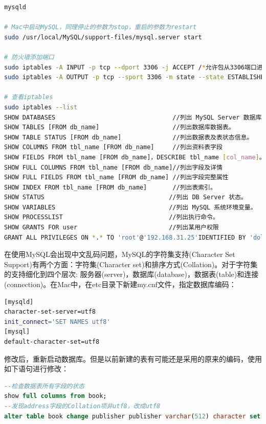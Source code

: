 \documentclass[12pt]{book}
\numberwithin{dummy}{section}
\theoremstyle{ocrenumbox}
\theoremstyle{blacknumex}
\theoremstyle{blacknumbox}
\theoremstyle{ocrenum}
\begin{document}
\begin{lstlisting}[language=Bash]
mysqld

# Mac中启动MySQL，同理停止的参数为stop，重启的参数为restart
sudo /usr/local/MySQL/support-files/mysql.server start

# 防火墙添加端口
sudo iptables -A INPUT -p tcp --dport 3306 -j ACCEPT /*允许包从3306端口进入*/
sudo iptables -A OUTPUT -p tcp --sport 3306 -m state --state ESTABLISHED -j ACCEPT /*允许从3306端口进入的包返回*/

# 查看iptables
sudo iptables --list
SHOW DATABASES                                //列出 MySQL Server 数据库。
SHOW TABLES [FROM db_name]                    //列出数据库数据表。
SHOW TABLE STATUS [FROM db_name]              //列出数据表及表状态信息。
SHOW COLUMNS FROM tbl_name [FROM db_name]     //列出资料表字段
SHOW FIELDS FROM tbl_name [FROM db_name]，DESCRIBE tbl_name [col_name]。
SHOW FULL COLUMNS FROM tbl_name [FROM db_name]//列出字段及详情
SHOW FULL FIELDS FROM tbl_name [FROM db_name] //列出字段完整属性
SHOW INDEX FROM tbl_name [FROM db_name]       //列出表索引。
SHOW STATUS                                  //列出 DB Server 状态。
SHOW VARIABLES                               //列出 MySQL 系统环境变量。
SHOW PROCESSLIST                             //列出执行命令。
SHOW GRANTS FOR user                         //列出某用户权限
GRANT ALL PRIVILEGES ON *.* TO 'root'@'192.168.31.25'IDENTIFIED BY 'dolphin' WITH GRANT OPTION;
\end{lstlisting}

在使用MySQL会出现中文乱码问题，MySQL的字符集支持(Character Set Support)有两个方面：字符集(Character set)和排序方式(Collation)。对于字符集的支持细化到四个层次: 服务器(server)，数据库(database)，数据表(table)和连接(connection)。在Mac中，在etc目录下新建my.cnf文件，指定数据库编码：

\begin{lstlisting}[language=Bash]
[mysqld]
character-set-server=utf8
init_connect='SET NAMES utf8'
[mysql]
default-character-set=utf8
\end{lstlisting}

修改后，重新启动数据库。但是以前新建的表有可能还是采用的原来的编码，使用如下语句进行修改：

\begin{lstlisting}[language=SQL]
--检查数据表所有字段的状态	
show full columns from book; 
--发现address字段的Collation项非utf8，改成utf8
alter table book change publisher publisher varchar(512) character set utf8 collate utf8_unicode_ci not null;
\end{lstlisting}
\end{document}
